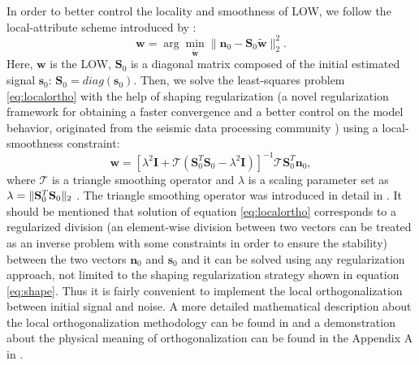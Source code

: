 In order to better control the locality and smoothness of LOW, we follow the local-attribute scheme introduced by \cite{fomel2007localattr}: %
\begin{equation}
\label{eq:localortho}
\mathbf{w} = \arg\min_{\mathbf{\tilde{w}}} \parallel \mathbf{n}_0 - \mathbf{S}_0\mathbf{\tilde{w}}\parallel_2^2. %
\end{equation}
Here, $\mathbf{w}$ is the LOW, $\mathbf{S}_0$ is a diagonal matrix composed of the initial estimated signal $\mathbf{s}_0$: $\mathbf{S}_0=diag(\mathbf{s}_0)$.
Then, we solve the least-squares problem \ref{eq:localortho} with the help of shaping regularization (a novel regularization framework for obtaining a faster convergence and a better control on the model behavior, originated from the seismic data processing community \cite{fomel2007shape}) using a local-smoothness constraint:
\begin{equation}
\label{eq:shape}
\mathbf{w} = [\lambda^2\mathbf{I} + \mathcal{T}(\mathbf{S}_0^T\mathbf{S}_0-\lambda^2\mathbf{I})]^{-1}\mathcal{T}\mathbf{S}_0^T\mathbf{n}_0,
\end{equation}
where $\mathcal{T}$ is a triangle smoothing operator and $\lambda$ is a scaling parameter set as $\lambda  = \Arrowvert\mathbf{S}_0^T\mathbf{S}_0\Arrowvert_2$ \cite{fomel2007localattr}. The triangle smoothing operator was introduced in detail in \cite{fomel2007shape}. It should be mentioned that solution of equation \ref{eq:localortho} corresponds to a regularized division (an element-wise division between two vectors can be treated as an inverse problem with some constraints in order to ensure the stability) between the two vectors $\mathbf{n}_0$ and $\mathbf{s}_0$ and it can be solved using any regularization approach, not limited to the shaping regularization strategy shown in equation \ref{eq:shape}. Thus it is fairly convenient to implement the local orthogonalization between initial signal and noise. A more detailed mathematical description about the local orthogonalization methodology can be found in \cite{yangkang2015ortho} and a demonstration about the physical meaning of orthogonalization can be found in the Appendix A in \cite{yangkang2015ortho}. 

